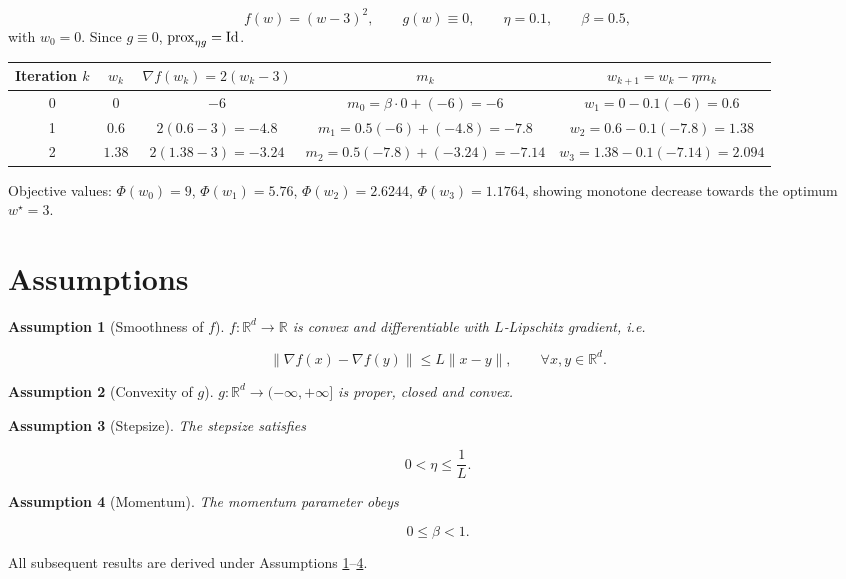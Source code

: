 \documentclass{article}
\newtheorem{assumption}{Assumption}
\begin{document}
\[
f(w)=(w-3)^2,\qquad g(w)\equiv 0,\qquad \eta=0.1,\qquad \beta=0.5,
\]
with $w_0=0$.  Since $g\equiv0$, $\operatorname{prox}_{\eta g}= {\rm Id}$.

\begin{center}
\begin{tabular}{c|c|c|c|c}
Iteration $k$ & $w_k$ & $\nabla f(w_k)=2(w_k-3)$ & $m_k$ & $w_{k+1}=w_k-\eta m_k$\\\hline
0 & $0$ & $-6$ & $m_0=\beta\cdot0+(-6)=-6$ & $w_1=0-0.1(-6)=0.6$\\
1 & $0.6$ & $2(0.6-3)=-4.8$ & $m_1=0.5(-6)+(-4.8)=-7.8$ & $w_2=0.6-0.1(-7.8)=1.38$\\
2 & $1.38$ & $2(1.38-3)=-3.24$ & $m_2=0.5(-7.8)+(-3.24)=-7.14$ & $w_3=1.38-0.1(-7.14)=2.094$
\end{tabular}
\end{center}

Objective values: $\Phi(w_0)=9$, $\Phi(w_1)=5.76$, $\Phi(w_2)=2.6244$, $\Phi(w_3)=1.1764$,
showing monotone decrease towards the optimum $w^\star=3$.

\section*{Assumptions}
\begin{assumption}[Smoothness of $f$]\label{as:lip}
$f:\mathbb{R}^d\to\mathbb{R}$ is convex and differentiable with $L$‑Lipschitz gradient, i.e.  

\[
\|\nabla f(x)-\nabla f(y)\|\le L\|x-y\|,\qquad\forall x,y\in\mathbb{R}^d .
\]
\end{assumption}

\begin{assumption}[Convexity of $g$]\label{as:g}
$g:\mathbb{R}^d\to(-\infty,+\infty]$ is proper, closed and convex.
\end{assumption}

\begin{assumption}[Stepsize]\label{as:stepsize}
The stepsize satisfies  

\[
0<\eta\le\frac{1}{L}.
\]
\end{assumption}

\begin{assumption}[Momentum]\label{as:beta}
The momentum parameter obeys  

\[
0\le\beta<1.
\]
\end{assumption}

All subsequent results are derived under Assumptions \ref{as:lip}–\ref{as:beta}.
\end{document}
